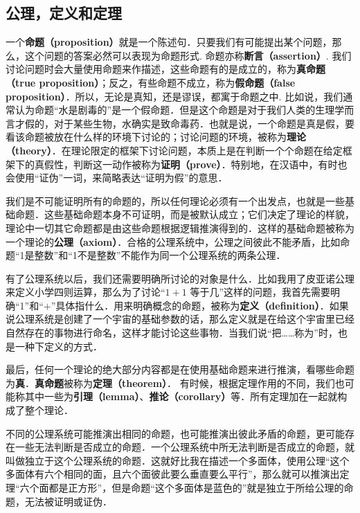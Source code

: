 
\subsection{公理，定义和定理}
一个\textbf{命题（proposition）}就是一个陈述句．只要我们有可能提出某个问题，那么，这个问题的答案必然可以表现为命题形式. 命题亦称\textbf{断言（assertion）}. 我们讨论问题时会大量使用命题来作描述，这些命题有的是成立的，称为\textbf{真命题（true proposition）}；反之，有些命题不成立，称为\textbf{假命题（false proposition）}．所以，无论是真知，还是谬误，都寓于命题之中. 比如说，我们通常认为命题“水是剧毒的”是一个假命题．但是这个命题是对于我们人类的生理学而言才假的，对于某些生物，水确实是致命毒药．也就是说，一个命题是真是假，要看该命题被放在什么样的环境下讨论的；讨论问题的环境，被称为\textbf{理论（theory）}．在理论限定的框架下讨论问题，本质上是在判断一个个命题在给定框架下的真假性，判断这一动作被称为\textbf{证明（prove）}．特别地，在汉语中，有时也会使用“证伪”一词，来简略表达“证明为假”的意思．

我们是不可能证明所有的命题的，所以任何理论必须有一个出发点，也就是一些基础命题．这些基础命题本身不可证明，而是被默认成立；它们决定了理论的样貌，理论中一切其它命题都是由这些命题根据逻辑推演得到的．这样的基础命题被称为一个理论的\textbf{公理（axiom）}．合格的公理系统中，公理之间彼此不能矛盾，比如命题“1是整数”和“1不是整数”不能作为同一个公理系统的两条公理．

有了公理系统以后，我们还需要明确所讨论的对象是什么．比如我用了皮亚诺公理来定义小学四则运算，那么为了讨论“$1+1$ 等于几”这样的问题，我首先需要明确“1”和“$+$”具体指什么．用来明确概念的命题，被称为\textbf{定义（definition）}．如果说公理系统是创建了一个宇宙的基础参数的话，那么定义就是在给这个宇宙里已经自然存在的事物进行命名，这样才能讨论这些事物．当我们说“把……称为”时，也是一种下定义的方式．

最后，任何一个理论的绝大部分内容都是在使用基础命题来进行推演，看哪些命题为\textbf{真}．\textbf{真命题}被称为\textbf{定理（theorem）}． 有时候，根据定理作用的不同，我们也可能称其中一些为\textbf{引理（lemma）}、\textbf{推论（corollary）}等．所有定理加在一起就构成了整个理论．

不同的公理系统可能推演出相同的命题，也可能推演出彼此矛盾的命题，更可能存在一些无法判断是否成立的命题．一个公理系统中所无法判断是否成立的命题，就叫做独立于这个公理系统的命题．这就好比我在描述一个多面体，使用公理“这个多面体有六个相同的面，且六个面彼此要么垂直要么平行”，那么就可以推演出定理“六个面都是正方形”，但是命题“这个多面体是蓝色的”就是独立于所给公理的命题，无法被证明或证伪．


